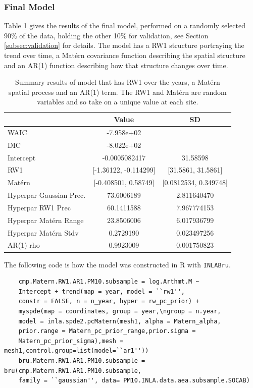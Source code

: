 \documentclass{article}
\begin{document}
\subsubsection*{Final Model} \label{seq:finalModel}

Table \ref{tab:model_INLA_full} gives the results of the final model, performed on a randomly selected 90\% of the data, holding the other 10\% for validation, see Section \ref{subsec:validation} for details.  The model has a \ac{RW}1 structure portraying the trend over time, a Mat\'{e}rn covariance function describing the spatial structure and an \ac{AR}(1) function describing how that structure changes over time.

\begin{table}[ht]
	\centering
	\begin{tabular}{l|c|c}
		& Value & SD  \\
		\hline
		WAIC & -7.958e+02   & \\
		DIC & -8.022e+02 & \\
		Intercept & -0.0005082417 & 31.58598  \\
		RW1 & [-1.36122, -0.114299] & [31.5861, 31.5861] \\
		Mat\'{e}rn & [-0.408501, 0.58749] & [0.0812534, 0.349748] \\
		Hyperpar Gaussian Prec. & 73.6006189  &  2.811640470 \\
		Hyperpar RW1 Prec & 60.1411588 & 7.967774153 \\ 
		Hyperpar Mat\'{e}rn Range & 23.8506006 & 6.017936799 \\
		Hyperpar Mat\'{e}rn Stdv & 0.2729190 & 0.023497256 \\
		AR(1) rho & 0.9923009 & 0.001750823 
	\end{tabular}
	\caption{Summary results of model that has RW1 over the years, a Mat\'{e}rn spatial process and an AR(1) term.   The RW1 and Mat\'{e}rn are random variables and so take on a unique value at each site. }
	\label{tab:model_INLA_full}
\end{table}

The following code is how the model was constructed in R with \lstinline{INLABru}.
\begin{lstlisting}
	cmp.Matern.RW1.AR1.PM10.subsample = log.Arthmt.M ~ 
	Intercept + trend(map = year, model = ``rw1'', 
	constr = FALSE, n = n_year, hyper = rw_pc_prior) +
	myspde(map = coordinates, group = year,\ngroup = n.year,
	model = inla.spde2.pcMatern(mesh1, alpha = Matern_alpha,
	prior.range = Matern_pc_prior_range,prior.sigma = 
	Matern_pc_prior_sigma),mesh = mesh1,control.group=list(model=``ar1''))
	bru.Matern.RW1.AR1.PM10.subsample = bru(cmp.Matern.RW1.AR1.PM10.subsample,             
	family = ``gaussian'', data= PM10.INLA.data.aea.subsample.SOCAB)
\end{lstlisting}
\end{document}
